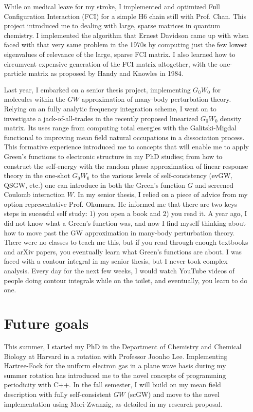 \documentclass[11pt]{article} %
\begin{document}
While on medical leave for my stroke, I implemented and optimized Full Configuration Interaction (FCI) for a simple H6 chain still with Prof. Chan. This project introduced me to dealing with large, sparse matrices in quantum chemistry. I implemented the algorithm that Ernest Davidson came up with when faced with that very same problem in the 1970s by computing just the few lowest eigenvalues of relevance of the large, sparse FCI matrix. I also learned how to circumvent expensive generation of the FCI matrix altogether, with the one-particle matrix as proposed by Handy and Knowles in 1984.

Last year, I embarked on a senior thesis project, implementing $G_0W_0$ for molecules within the $GW$ approximation of many-body perturbation theory. Relying on an fully analytic frequency integration scheme, I went on to investigate a jack-of-all-trades in the recently proposed linearized $G_0W_0$ density matrix. Its uses range from computing total energies with the Galitski-Migdal functional to improving mean field natural occupations in a dissociation process. This formative experience introduced me to concepts that will enable me to apply Green's functions to electronic structure in my PhD studies; from how to construct the self-energy with the random phase approximation of linear response theory in the one-shot $G_0W_0$ to the various levels of self-consistency (evGW, QSGW, etc.) one can introduce in both the Green's function $G$ and screened Coulomb interaction $W$. In my senior thesis, I relied on a piece of advice from my option representative Prof. Okumura. He informed me that there are two keys steps in sucessful self study: 1) you open a book and 2) you read it. A year ago, I did not know what a Green's function was, and now I find myself thinking about how to move past the GW approximation in many-body perturbation theory. There were no classes to teach me this, but if you read through enough textbooks and arXiv papers, you eventually learn what Green’s functions are about. I was faced with a contour integral in my senior thesis, but I never took complex analysis. Every day for the next few weeks, I would watch YouTube videos of people doing contour integrals while on the toilet, and eventually, you learn to do one.
\section{Future goals}  
This summer, I started my PhD in the Department of Chemistry and Chemical Biology at Harvard in a rotation with Professor Joonho Lee. Implementing Hartree-Fock for the uniform electron gas in a plane wave basis during my summer rotation has introduced me to the novel concepts of programming periodicity with C++. In the fall semester, I will build on my mean field description with fully self-consistent $GW$ (scGW) and move to the novel implementation using Mori-Zwanzig, as detailed in my research proposal.  
\end{document}

